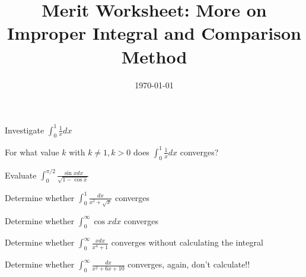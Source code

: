 

\title{Merit Worksheet: More on Improper Integral and Comparison Method}
\date{\today}

\bd
\maketitle

\be
	\item Investigate $\int_0^1\frac{1}{x}dx$
	\vfill
	\item For what value $k$ with $k \neq 1, k >0$ does $\int_0^1\frac{1}{x}dx$ converges?
	\vfill
	\item Evaluate $\int_0^{\pi/2}\frac{\sin x dx}{\sqrt{1-\cos x}}$\vfill
	\newpage
	\item Determine whether $\int_0^1 \frac{dx}{x^2+\sqrt x}$ converges

	\vfill
	\item Determine whether $\int_0^\infty \cos x dx$ converges
	\vfill
	\item Determine whether $\int_0^\infty\frac{xdx}{x^4+1}$ converges without calculating the integral 
	\vfill
	\item Determine whether $\int_0^\infty \frac{dx}{x^2+6x+10}$ converges, again, don't calculate!!
	\vfill
\ee
\ed
